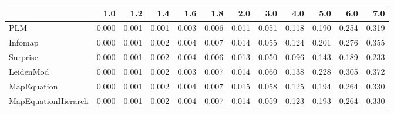 \begin{tabular}{lrrrrrrrrrrr}
\toprule
{} &   1.0 &   1.2 &   1.4 &   1.6 &   1.8 &   2.0 &   3.0 &   4.0 &   5.0 &   6.0 &   7.0 \\
\midrule
PLM                 & 0.000 & 0.001 & 0.001 & 0.003 & 0.006 & 0.011 & 0.051 & 0.118 & 0.190 & 0.254 & 0.319 \\
Infomap             & 0.000 & 0.001 & 0.002 & 0.004 & 0.007 & 0.014 & 0.055 & 0.124 & 0.201 & 0.276 & 0.355 \\
Surprise            & 0.000 & 0.001 & 0.002 & 0.004 & 0.006 & 0.013 & 0.050 & 0.096 & 0.143 & 0.189 & 0.233 \\
LeidenMod           & 0.000 & 0.001 & 0.002 & 0.003 & 0.007 & 0.014 & 0.060 & 0.138 & 0.228 & 0.305 & 0.372 \\
MapEquation         & 0.000 & 0.001 & 0.002 & 0.004 & 0.007 & 0.015 & 0.058 & 0.125 & 0.194 & 0.264 & 0.330 \\
MapEquationHierarch & 0.000 & 0.001 & 0.002 & 0.004 & 0.007 & 0.014 & 0.059 & 0.123 & 0.193 & 0.264 & 0.330 \\
\bottomrule
\end{tabular}
